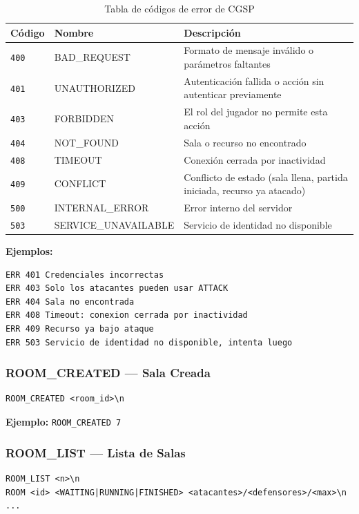 \documentclass[12pt, letterpaper]{article}
\begin{document}
\begin{table}[H]
\centering
\begin{tabularx}{\textwidth}{l l X}
\toprule
\textbf{Código} & \textbf{Nombre} & \textbf{Descripción} \\
\midrule
\texttt{400} & BAD\_REQUEST & Formato de mensaje inválido o parámetros faltantes \\
\texttt{401} & UNAUTHORIZED & Autenticación fallida o acción sin autenticar previamente \\
\texttt{403} & FORBIDDEN & El rol del jugador no permite esta acción \\
\texttt{404} & NOT\_FOUND & Sala o recurso no encontrado \\
\texttt{408} & TIMEOUT & Conexión cerrada por inactividad \\
\texttt{409} & CONFLICT & Conflicto de estado (sala llena, partida iniciada, recurso ya atacado) \\
\texttt{500} & INTERNAL\_ERROR & Error interno del servidor \\
\texttt{503} & SERVICE\_UNAVAILABLE & Servicio de identidad no disponible \\
\bottomrule
\end{tabularx}
\caption{Tabla de códigos de error de CGSP}
\end{table}

\textbf{Ejemplos:}
\begin{lstlisting}
ERR 401 Credenciales incorrectas
ERR 403 Solo los atacantes pueden usar ATTACK
ERR 404 Sala no encontrada
ERR 408 Timeout: conexion cerrada por inactividad
ERR 409 Recurso ya bajo ataque
ERR 503 Servicio de identidad no disponible, intenta luego
\end{lstlisting}

\subsubsection{ROOM\_CREATED --- Sala Creada}

\begin{lstlisting}
ROOM_CREATED <room_id>\n
\end{lstlisting}

\textbf{Ejemplo:} \texttt{ROOM\_CREATED 7}

\subsubsection{ROOM\_LIST --- Lista de Salas}
\label{sec:room-list}

\begin{lstlisting}
ROOM_LIST <n>\n
ROOM <id> <WAITING|RUNNING|FINISHED> <atacantes>/<defensores>/<max>\n
...
\end{lstlisting}
\end{document}

